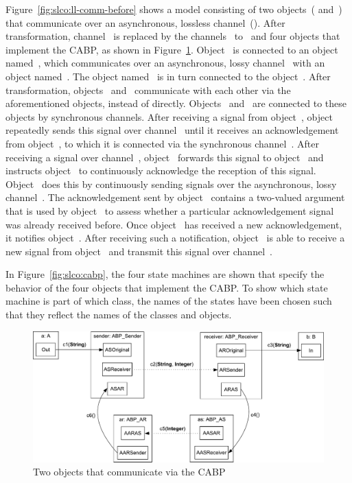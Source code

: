 Figure~\ref{fig:slco:ll-comm-before} shows a model consisting of two objects~( and~) that communicate over an asynchronous, lossless channel~().
After transformation, channel~ is replaced by the channels~ to~ and four objects that implement the CABP, as shown in Figure~\ref{fig:slco:ll-comm-after}.
Object~ is connected to an object named~, which communicates over an asynchronous, lossy channel~ with an object named~.
The object named~ is in turn connected to the object~.
After transformation, objects~ and~ communicate with each other via the aforementioned objects, instead of directly.
Objects~ and~ are connected to these objects by synchronous channels.
After receiving a signal from object~, object~ repeatedly sends this signal over channel~ until it receives an acknowledgement from object~, to which it is connected via the synchronous channel~.
After receiving a signal over channel~, object~ forwards this signal to object~ and instructs object~ to continuously acknowledge the reception of this signal.
Object~ does this by continuously sending signals over the asynchronous, lossy channel~.
The acknowledgement sent by object~ contains a two-valued argument that is used by object~ to assess whether a particular acknowledgement signal was already received before.
Once object~ has received a new acknowledgement, it notifies object~.
After receiving such a notification, object~ is able to receive a new signal from object~ and transmit this signal over channel~.

In Figure~\ref{fig:slco:cabp}, the four state machines are shown that specify the behavior of the four objects that implement the CABP.
To show which state machine is part of which class, the names of the states have been chosen such that they reflect the names of the classes and objects.

\begin{figure}[hbt]
  \centering
  \includegraphics[scale=0.45]{slco/figs/transformations/Communication_Lossless2Lossy_ll}
  \caption{Two objects that communicate via the CABP}
  \label{fig:slco:ll-comm-after}
\end{figure}



